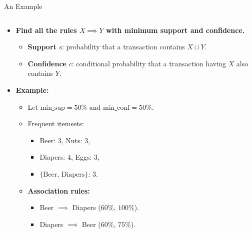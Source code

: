 \begin{frame}{An Example}
\begin{columns}
\begin{column}{0.5\textwidth}
			\begin{itemize}
				\item \textbf{Find all the rules $X \implies Y$ with minimum 
				support and confidence.}
				\begin{itemize}
					\item \textbf{Support} $s$: probability that a transaction 
					contains $X \cup Y$.
					\item \textbf{Confidence} $c$: conditional probability that 
					a transaction having $X$ also contains $Y$.
				\end{itemize}
				\item \textbf{Example:}
				\begin{itemize}
					\item Let $\text{min\_sup} = 50\%$ and $\text{min\_conf} = 
					50\%$.
					\item Frequent itemsets:
					\begin{itemize}
						\item Beer: $3$, Nuts: $3$,
						\item Diapers: $4$, Eggs: $3$,
						\item $\{\text{Beer, Diapers}\}$: $3$.
					\end{itemize}
					\item \textbf{Association rules:}
					\begin{itemize}
						\item Beer $\implies$ Diapers ($60\%$, $100\%$).
						\item Diapers $\implies$ Beer ($60\%$, $75\%$).
					\end{itemize}
				\end{itemize}
			\end{itemize}
		\end{column}
	\end{columns}
\end{frame}

